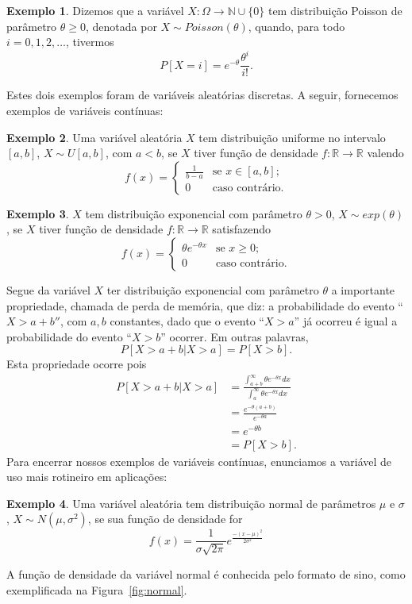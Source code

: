 \documentclass[twoside,openright,titlepage,numbers=noenddot,headinclude,  lineheaders footinclude=true,cleardoublepage=empty,
                                BCOR=5mm,paper=a4,fontsize=12pt ]{scrbook}
\theoremstyle{definition}
\newtheorem{exmp}{Exemplo}[section]
\begin{document}
\begin{exmp}
Dizemos que a variável $X: \Omega \rightarrow \mathbb{N}\cup \{0\}$ tem distribuição Poisson de parâmetro $\theta \geq 0$,
denotada por $X \sim Poisson(\theta)$, quando, para todo $i = 0, 1, 2, \ldots$, tivermos
\[
P[ X = i ] = e^{-\theta} \frac{\theta^i }{i!}.
\]
\end{exmp}
Estes dois exemplos foram de variáveis aleatórias discretas. A seguir, fornecemos
exemplos de variáveis contínuas:
\begin{exmp}
Uma variável aleatória $X$ tem distribuição uniforme no intervalo $[a,b]$,
$X \sim U[a,b]$, com $a < b$, se $X$ tiver função de densidade $f: \mathbb{R} 
\rightarrow \mathbb{R}$ valendo
\[
f(x) = 
\begin{cases}
\frac{1}{b-a} & \text{se } x \in [a,b];\\
0 & \text{caso contrário}.
\end{cases}
\]
\end{exmp}

\begin{exmp}
$X$ tem distribuição exponencial com parâmetro $\theta > 0$, $X \sim exp(\theta)$,
se $X$ tiver função de densidade $f: \mathbb{R} \rightarrow \mathbb{R}$
satisfazendo
\[
f(x) = 
\begin{cases}
\theta e^{-\theta x} & \text{se } x \geq 0;\\
0 & \text{caso contrário}.
\end{cases}
\]
\end{exmp}
Segue da variável $X$ ter distribuição exponencial com parâmetro $\theta$ a importante propriedade, chamada de perda de memória,
que diz: a probabilidade do evento ``$X > a + b''$, com $a, b$ constantes, dado que o evento
``$X > a$'' já ocorreu é igual a probabilidade do evento ``$X > b$'' ocorrer. Em outras palavras,
\[
P[ X > a + b| X > a] = P[ X > b].
\]
Esta propriedade ocorre pois
\begin{align*}
P[ X > a + b| X > a] &= \frac{ \int_{a+b}^{\infty} \theta e^{-\theta x} dx }{ \int_{a}^{\infty} \theta e^{-\theta x} dx }\\
					 &= \frac{ e^{-\theta (a+b) }}{ e^{-\theta a}}\\
					 &= e^{-\theta b}\\
					 &= P[ X > b].
\end{align*}
Para encerrar nossos exemplos de variáveis contínuas, enunciamos a variável
de uso mais rotineiro em aplicações:
\begin{exmp}
Uma variável aleatória tem distribuição normal de parâmetros $\mu \text{ e }\sigma$,
$X \sim N(\mu, \sigma^2)$, se sua função de densidade for
\[
f(x) = \frac{1}{\sigma \sqrt{2 \pi} } e^{ \frac{ -(x - \mu)^2 }{2 \sigma^2} }
\]
\end{exmp}
A função de densidade da variável normal é conhecida pelo formato de sino, como
exemplificada na Figura~\ref{fig:normal}.
\end{document}
